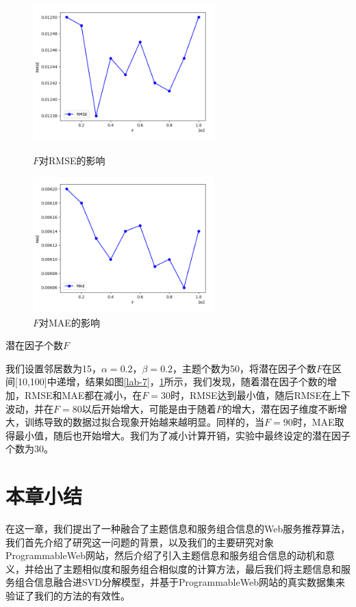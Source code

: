 \documentclass[master,winfonts]{njuthesis}
\begin{document}
\begin{arabicenum}
\begin{figure}[htbp]
\centering
\begin{minipage}[t]{0.48\textwidth}
\centering
\includegraphics[width=7cm]{F_a.png}
\caption{$F$对RMSE的影响}\label{lab-7}
\end{minipage}
\begin{minipage}[t]{0.48\textwidth}
\centering
\includegraphics[width=7cm]{F_b.png}
\caption{$F$对MAE的影响}\label{lab-8}
\end{minipage}
\end{figure}

\item 潜在因子个数$F$

我们设置邻居数为15，$\alpha=0.2$，$\beta=0.2$，主题个数为50，将潜在因子个数$F$在区间[10,100]中递增，结果如图\ref{lab-7}，\ref{lab-8}所示，我们发现，随着潜在因子个数的增加，RMSE和MAE都在减小，在$F=30$时，RMSE达到最小值，随后RMSE在上下波动，并在$F=80$以后开始增大，可能是由于随着$F$的增大，潜在因子维度不断增大，训练导致的数据过拟合现象开始越来越明显。同样的，当$F=90$时，MAE取得最小值，随后也开始增大。我们为了减小计算开销，实验中最终设定的潜在因子个数为30。

\end{arabicenum}
\section{本章小结}

在这一章，我们提出了一种融合了主题信息和服务组合信息的Web服务推荐算法，我们首先介绍了研究这一问题的背景，以及我们的主要研究对象ProgrammableWeb网站，然后介绍了引入主题信息和服务组合信息的动机和意义，并给出了主题相似度和服务组合相似度的计算方法，最后我们将主题信息和服务组合信息融合进SVD分解模型，并基于ProgrammableWeb网站的真实数据集来验证了我们的方法的有效性。
\end{document}
